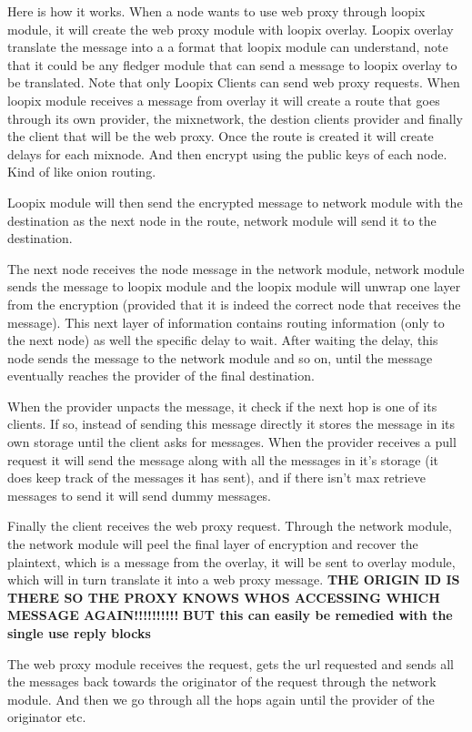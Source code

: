 \documentclass[a4paper,11pt,oneside]{report}
\begin{document}
Here is how it works. When a node wants to use web proxy through loopix module, it will create the web proxy module with loopix overlay. Loopix overlay translate the message into a a format that loopix module can understand, note that it could be any fledger module that can send a message to loopix overlay to be translated. Note that only Loopix Clients can send web proxy requests. When loopix module receives a message from overlay it will create a route that goes through its own provider, the mixnetwork, the destion clients provider and finally the client that will be the web proxy. Once the route is created it will create delays for each mixnode. And then encrypt using the public keys of each node. Kind of like onion routing.

Loopix module will then send the encrypted message to network module with the destination as the next node in the route, network module will send it to the destination.

The next node receives the node message in the network module, network module sends the message to loopix module and the loopix module will unwrap one layer from the encryption (provided that it is indeed the correct node that receives the message). This next layer of information contains routing information (only to the next node) as well the specific delay to wait. After waiting the delay, this node sends the message to the network module and so on, until the message eventually reaches the provider of the final destination.

When the provider unpacts the message, it check if the next hop is one of its clients. If so, instead of sending this message directly it stores the message in its own storage until the client asks for messages. When the provider receives a pull request it will send the message along with all the messages in it's storage (it does keep track of the messages it has sent), and if there isn't max retrieve messages to send it will send dummy messages.

Finally the client receives the web proxy request. Through the network module, the network module will peel the final layer of encryption and recover the plaintext, which is a message from the overlay, it will be sent to overlay module, which will in turn translate it into a web proxy message.
\textbf{THE ORIGIN ID IS THERE SO THE PROXY KNOWS WHOS ACCESSING WHICH MESSAGE AGAIN!!!!!!!!!!}
\textbf{BUT this can easily be remedied with the single use reply blocks}

The web proxy module receives the request, gets the url requested and sends all the messages back towards the originator of the request through the network module. And then we go through all the hops again until the provider of the originator etc.
\end{document}
